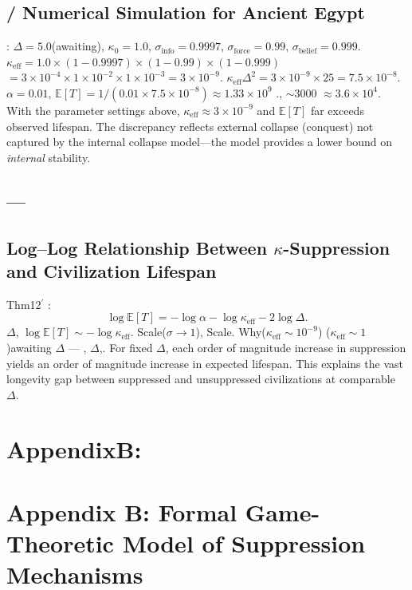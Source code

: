 \documentclass[11pt,a4paper]{article}
\theoremstyle{definition}
\newcommand{\coupling}{\kappa}
\newcommand{\suppress}{\sigma}
\newcommand{\E}{\mathbb{E}}
\begin{document}
\subsection{ / Numerical Simulation for Ancient Egypt}
: $\Delta = 5.0$(awaiting), $\coupling_0 = 1.0$, 
$\suppress_{\text{info}} = 0.9997$, $\suppress_{\text{force}} = 0.99$, 
$\suppress_{\text{belief}} = 0.999$.
 $\coupling_{\text{eff}} = 1.0 \times (1-0.9997) \times (1-0.99) \times (1-0.999)$
$= 3 \times 10^{-4} \times 1 \times 10^{-2} \times 1 \times 10^{-3} = 3 \times 10^{-9}$.
$\coupling_{\text{eff}} \Delta^2 = 3 \times 10^{-9} \times 25 = 7.5 \times 10^{-8}$.
 $\alpha = 0.01$, $\E[T] = 1 / (0.01 \times 7.5 \times 10^{-8}) \approx 1.33 \times 10^9$
., $\sim 3000$ $\approx 3.6 \times 10^4$.
With the parameter settings above, $\coupling_{\text{eff}} \approx 3 \times 10^{-9}$ and
$\E[T]$ far exceeds observed lifespan. The discrepancy reflects external collapse
(conquest) not captured by the internal collapse model---the model provides a lower bound
on \emph{internal} stability.
\subsection{---}
\subsection{Log--Log Relationship Between $\coupling$-Suppression and Civilization Lifespan}
 Thm12$^\prime$ : 
\[
\log \E[T] = -\log\alpha - \log\coupling_{\text{eff}} - 2\log\Delta.
\]
 $\Delta$, $\log \E[T] \sim -\log\coupling_{\text{eff}}$.
Scale($\suppress \to 1$), Scale.
Why($\coupling_{\text{eff}} \sim 10^{-9}$)
($\coupling_{\text{eff}} \sim 1$)awaiting $\Delta$ ---
, $\Delta$,.
For fixed $\Delta$, each order of magnitude increase in suppression yields an order
of magnitude increase in expected lifespan. This explains the vast longevity gap
between suppressed and unsuppressed civilizations at comparable $\Delta$.
\section{AppendixB:}
\section{Appendix B: Formal Game-Theoretic Model of Suppression Mechanisms}
\end{document}
